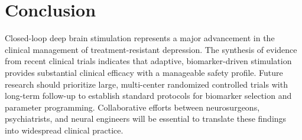 \section{Conclusion}
Closed-loop deep brain stimulation represents a major advancement in the clinical management of treatment-resistant depression. The synthesis of evidence from recent clinical trials indicates that adaptive, biomarker-driven stimulation provides substantial clinical efficacy with a manageable safety profile. Future research should prioritize large, multi-center randomized controlled trials with long-term follow-up to establish standard protocols for biomarker selection and parameter programming. Collaborative efforts between neurosurgeons, psychiatrists, and neural engineers will be essential to translate these findings into widespread clinical practice.
